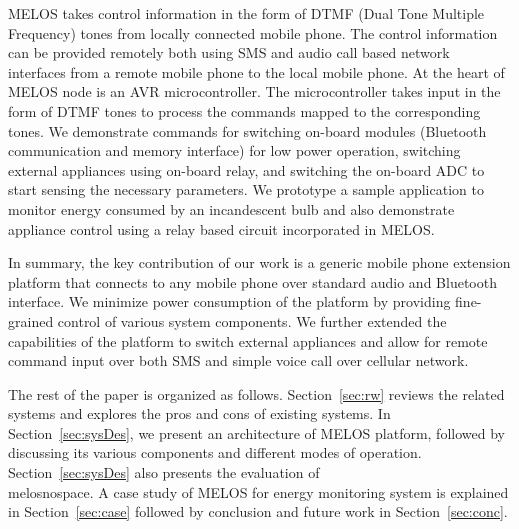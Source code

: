 \documentclass[10pt]{sigplan-proc-varsize}
\newcommand{\secref}[1]{Section~\ref{#1}}
\newcommand{\melos}{MELOS }
\newcommand{\melosnospace}{MELOS}
\begin{document}
\melos takes control information in the form of DTMF (Dual Tone Multiple Frequency) tones from locally connected mobile phone. The control information can be provided remotely both using SMS and audio call based network interfaces from a remote mobile phone to the local mobile phone. At the heart of \melos node is an AVR microcontroller. The microcontroller takes input in the form of DTMF tones to process the commands mapped to the corresponding tones. We demonstrate commands for switching on-board modules (Bluetooth communication and memory interface) for low power operation, switching external appliances using on-board relay, and switching the on-board ADC to start sensing the necessary parameters. We prototype a sample application to monitor energy consumed by an incandescent bulb and also demonstrate appliance control using a relay based circuit incorporated in \melosnospace.  

In summary, the key contribution of our work is a generic mobile phone extension platform that connects to any mobile phone over standard audio and Bluetooth interface. We minimize power consumption of the platform by providing fine-grained control of various system components. We further extended the capabilities of the platform to switch external appliances and allow for remote command input over both SMS and simple voice call over cellular network. 

The rest of the paper is organized as follows. \secref{sec:rw} reviews the related systems and explores the pros and cons of existing systems. In \secref{sec:sysDes}, we present an architecture of \melos platform, followed by discussing its various components and different modes of operation. \secref{sec:sysDes} also presents the evaluation of \\melosnospace. A case study of \melos for energy monitoring system is explained in \secref{sec:case} followed by conclusion and future work in \secref{sec:conc}.
\end{document}

